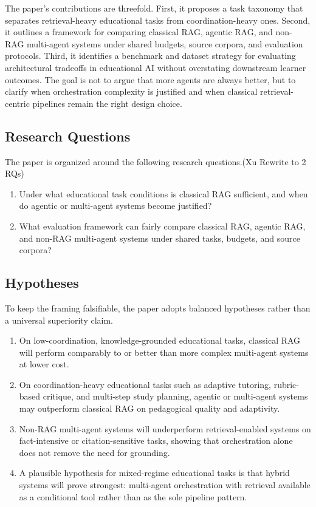 The paper's contributions are threefold. First, it proposes a task taxonomy that separates retrieval-heavy educational tasks from coordination-heavy ones. Second, it outlines a framework for comparing classical RAG, agentic RAG, and non-RAG multi-agent systems under shared budgets, source corpora, and evaluation protocols. Third, it identifies a benchmark and dataset strategy for evaluating architectural tradeoffs in educational AI without overstating downstream learner outcomes. The goal is not to argue that more agents are always better, but to clarify when orchestration complexity is justified and when classical retrieval-centric pipelines remain the right design choice.

\subsection{Research Questions}

The paper is organized around the following research questions.(Xu Rewrite to 2 RQs)

\begin{enumerate}[label=RQ\arabic*:,leftmargin=*]
    \item Under what educational task conditions is classical RAG sufficient, and when do agentic or multi-agent systems become justified?
    \item What evaluation framework can fairly compare classical RAG, agentic RAG, and non-RAG multi-agent systems under shared tasks, budgets, and source corpora?
\end{enumerate}

\subsection{Hypotheses}

To keep the framing falsifiable, the paper adopts balanced hypotheses rather than a universal superiority claim.

\begin{enumerate}[label=H\arabic*:,leftmargin=*]
    \item On low-coordination, knowledge-grounded educational tasks, classical RAG will perform comparably to or better than more complex multi-agent systems at lower cost.
    \item On coordination-heavy educational tasks such as adaptive tutoring, rubric-based critique, and multi-step study planning, agentic or multi-agent systems may outperform classical RAG on pedagogical quality and adaptivity.
    \item Non-RAG multi-agent systems will underperform retrieval-enabled systems on fact-intensive or citation-sensitive tasks, showing that orchestration alone does not remove the need for grounding.
    \item A plausible hypothesis for mixed-regime educational tasks is that hybrid systems will prove strongest: multi-agent orchestration with retrieval available as a conditional tool rather than as the sole pipeline pattern.
\end{enumerate}

